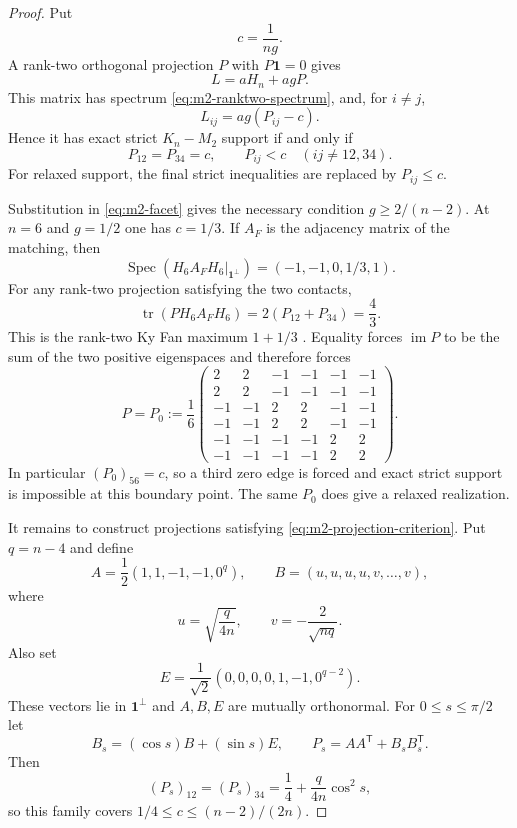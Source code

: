 \documentclass[11pt,reqno]{amsart}
\theoremstyle{definition}
\theoremstyle{remark}
\newcommand{\one}{\mathbf 1}
\newcommand{\Spec}{\operatorname{Spec}}
\newcommand{\tr}{\operatorname{tr}}
\begin{document}
\begin{proof}
Put
\[
 c=\frac1{ng}.
\]
A rank-two orthogonal projection $P$ with $P\one=0$ gives
\[
 L=aH_n+agP.
\]
This matrix has spectrum \eqref{eq:m2-ranktwo-spectrum}, and, for $i\ne j$,
\[
 L_{ij}=ag(P_{ij}-c).
\]
Hence it has exact strict $K_n-M_2$ support if and only if
\begin{equation}\label{eq:m2-projection-criterion}
 P_{12}=P_{34}=c,\qquad P_{ij}<c\quad(ij\ne12,34).
\end{equation}
For relaxed support, the final strict inequalities are replaced by
$P_{ij}\le c$.

Substitution in \eqref{eq:m2-facet} gives the necessary condition
$g\ge2/(n-2)$.  At $n=6$ and $g=1/2$ one has $c=1/3$.  If $A_F$ is the
adjacency matrix of the matching, then
\[
 \Spec(H_6A_FH_6|_{\one^\perp})=(-1,-1,0,1/3,1).
\]
For any rank-two projection satisfying the two contacts,
\[
 \tr(PH_6A_FH_6)=2(P_{12}+P_{34})=\frac43.
\]
This is the rank-two Ky Fan maximum $1+1/3$
\cite[Chapter~III]{Bhatia1997}.  Equality forces
$\operatorname{im}P$ to be the sum of the two positive eigenspaces and
therefore forces
\[
 P=P_0:=\frac16
 \begin{pmatrix}
 2&2&-1&-1&-1&-1\\
 2&2&-1&-1&-1&-1\\
 -1&-1&2&2&-1&-1\\
 -1&-1&2&2&-1&-1\\
 -1&-1&-1&-1&2&2\\
 -1&-1&-1&-1&2&2
 \end{pmatrix}.
\]
In particular $(P_0)_{56}=c$, so a third zero edge is forced and exact
strict support is impossible at this boundary point.  The same $P_0$ does
give a relaxed realization.

It remains to construct projections satisfying
\eqref{eq:m2-projection-criterion}.  Put $q=n-4$ and define
\[
 A=\frac12(1,1,-1,-1,0^q),\qquad
 B=(u,u,u,u,v,\ldots,v),
\]
where
\[
 u=\sqrt{\frac q{4n}},\qquad v=-\frac2{\sqrt{nq}}.
\]
Also set
\[
 E=\frac1{\sqrt2}(0,0,0,0,1,-1,0^{q-2}).
\]
These vectors lie in $\one^\perp$ and $A,B,E$ are mutually orthonormal.
For $0\le s\le\pi/2$ let
\[
 B_s=(\cos s)B+(\sin s)E,\qquad
 P_s=AA^{\mathsf T}+B_sB_s^{\mathsf T}.
\]
Then
\begin{equation}\label{eq:m2-contact-large-c}
 (P_s)_{12}=(P_s)_{34}
 =\frac14+\frac q{4n}\cos^2s,
\end{equation}
so this family covers
$1/4\le c\le(n-2)/(2n)$.


\end{proof}
\end{document}

